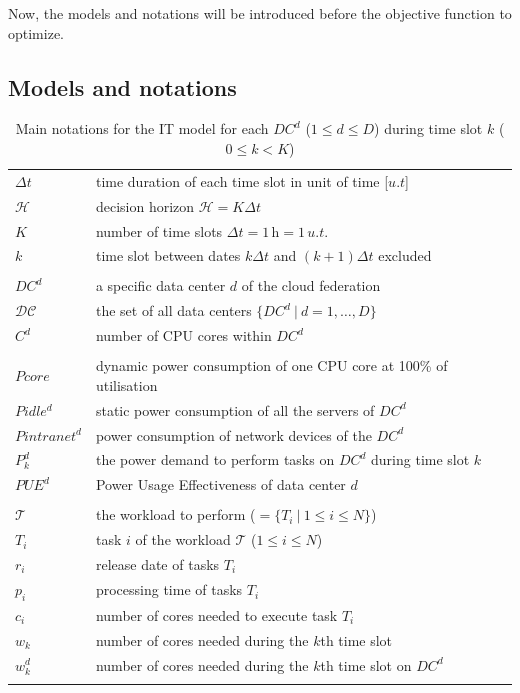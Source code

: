 Now, the models and notations will be introduced before the objective function to optimize.

\subsection{Models and notations}
\label{sec:modelsnotations_ccgrid}

\begin{table}[!t]
\caption{Main notations for the IT model for each $DC^d$ ($1\leq d\leq D$) during time slot $k$ ($0\leq k< K$)\label{table:variablesIT}}
\begin{center}
\begin{tabular}{l p{6cm}}

$\Delta t$ & time duration of each time slot in unit of time [$u.t$] \\
$\mathcal{H}$ & decision horizon $\mathcal{H} = K\Delta t$ \\
$K$ & number of time slots $\Delta t = 1\,\text{h} = 1\,u.t.$ \\ 
$k$ & time slot between dates $k\Delta t$ and $(k+1)\Delta t$ excluded \\ \\
$DC^d$ & a specific data center $d$ of the cloud federation \\
$\mathcal{DC}$ & the set of all data centers $\{DC^d \ | \ d=1, \ldots, D\}$ \\
$C^d$ & number of CPU cores within $DC^d$ \\
\\
$Pcore$ & dynamic power consumption of one CPU core at 100\% of utilisation \\
$Pidle^d$ & static power consumption of all the servers of $DC^d$ \\
$Pintranet^d$ & power consumption of network devices of the $DC^d$  \\
$P_k^d$ & the power demand to perform tasks on $DC^d$ during time slot $k$ \\ 
$PUE^d$ & Power Usage Effectiveness of data center $d$\\ 
\\
$\mathcal{T}$ & the workload to perform ($ = \{ T_i\ |\ 1\leq i\leq N\}$) \\
$T_i$ & task $i$ of the workload $\mathcal{T}$ ($1\leq i\leq N$) \\
$r_i$ & release date of tasks $T_i$\\
$p_i$ & processing time of tasks $T_i$\\
$c_i$ & number of cores needed to execute task $T_i$\\ 
$w_k$ & number of cores needed during the $k$th time slot \\
$w_k^d$ & number of cores needed during the $k$th time slot on $DC^d$\\ \\
\end{tabular}
\end{center}
\end{table}


